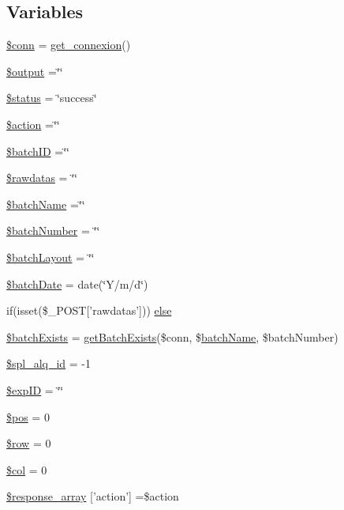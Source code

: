 \subsection*{Variables}
\begin{DoxyCompactItemize}
\item 
\hyperlink{insert__batch_8php_aa8a5a87b9c1a6a0819b88447cbe41877}{\$conn} = \hyperlink{php__functions_8php_ace18bc10f3fd08f92688ac743e0d8c2e}{get\-\_\-connexion}()
\item 
\hyperlink{insert__batch_8php_a73004ce9cd673c1bfafd1dc351134797}{\$output} =\char`\"{}\char`\"{}
\item 
\hyperlink{insert__batch_8php_a58391ea75f2d29d5d708d7050b641c33}{\$status} = \char`\"{}success\char`\"{}
\item 
\hyperlink{insert__batch_8php_ad1f5a0905b3483329061c134a074ed4c}{\$action} =\char`\"{}\char`\"{}
\item 
\hyperlink{insert__batch_8php_aaa6d122ea9cb55b210aadd86e5654a74}{\$batch\-I\-D} =\char`\"{}\char`\"{}
\item 
\hyperlink{insert__batch_8php_abdab71b959b28075ae105e76f2bb59c4}{\$rawdatas} = \char`\"{}\char`\"{}
\item 
\hyperlink{insert__batch_8php_ae0139f42f02473374ecb453f87c66534}{\$batch\-Name} =\char`\"{}\char`\"{}
\item 
\hyperlink{insert__batch_8php_a5efc7692d3e718869a2ba3a55876129c}{\$batch\-Number} = \char`\"{}\char`\"{}
\item 
\hyperlink{insert__batch_8php_a6fa65e8ebf49b9db3eaf85cfd31d1908}{\$batch\-Layout} = \char`\"{}\char`\"{}
\item 
\hyperlink{insert__batch_8php_a93afdd8e66e69e182754fff598ebf16b}{\$batch\-Date} = date(\char`\"{}Y/m/d\char`\"{})
\item 
if(isset(\$\-\_\-\-P\-O\-S\-T\mbox{[}'rawdatas'\mbox{]})) \hyperlink{insert__batch_8php_a753a9e142fa9d5ae330b048b41897a07}{else}
\item 
\hyperlink{insert__batch_8php_afccc8a9380f3ccdc91175a89f48e5474}{\$batch\-Exists} = \hyperlink{insert__batch_8php_aca2d979885679313254be10ee45926c9}{get\-Batch\-Exists}(\$conn, \$\hyperlink{obsolete_2processing__bak_8php_aacb4c47c97ff6a475764ba2cf4090a32}{batch\-Name}, \$batch\-Number)
\item 
\hyperlink{insert__batch_8php_a21f886ec964303dbe9fd97ad31a0951b}{\$spl\-\_\-alq\-\_\-id} = -\/1
\item 
\hyperlink{insert__batch_8php_ae384d32e62e85e587cd27bf249ed3db3}{\$exp\-I\-D} = \char`\"{}\char`\"{}
\item 
\hyperlink{insert__batch_8php_a5de51f0c80b3bb3b39a57b23f6b9ea9f}{\$pos} = 0
\item 
\hyperlink{insert__batch_8php_aa1d731aa570613e5bcff831bb10e9b87}{\$row} = 0
\item 
\hyperlink{insert__batch_8php_afca5b7d4c9144178253e99d0ada7d519}{\$col} = 0
\item 
\hyperlink{insert__batch_8php_ae768978a0cdc416c0d63d798c85c8784}{\$response\-\_\-array} \mbox{[}'action'\mbox{]} =\$action
\end{DoxyCompactItemize}


